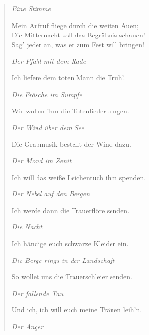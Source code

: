 \begin{verse}
\smallskip

\textit{Eine Stimme}

\smallskip

Mein Aufruf fliege durch die weiten Auen; \\
Die Mitternacht soll das Begräbnis schauen! \\
Sag’ jeder an, was er zum Fest will bringen!

\smallskip

\textit{Der Pfahl mit dem Rade}

\smallskip

Ich liefere dem toten Mann die Truh’.

\smallskip

\textit{Die Frösche im Sumpfe}

\smallskip

Wir wollen ihm die Totenlieder singen.

\smallskip

\textit{Der Wind über dem See}

\smallskip

Die Grabmusik bestellt der Wind dazu.

\smallskip

\textit{Der Mond im Zenit}

\smallskip

Ich will das weiße Leichentuch ihm spenden.

\smallskip

\textit{Der Nebel auf den Bergen}

\smallskip

Ich werde dann die Trauerflöre senden.

\smallskip

\textit{Die Nacht}

\smallskip

Ich händige euch schwarze Kleider ein.

\smallskip

\textit{Die Berge rings in der Landschaft}

\smallskip

So wollet uns die Trauerschleier senden.

\smallskip

\textit{Der fallende Tau}

\smallskip

Und ich, ich will euch meine Tränen leih’n.

\pagebreak

\textit{Der Anger}

\smallskip


\end{verse}
